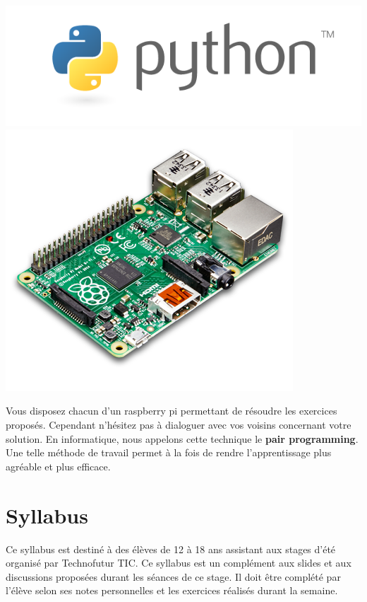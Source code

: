 \documentclass[12pt,a4paper,oneside]{report}
\begin{document}
\begin{minipage}[r]{0.30\textwidth}
	\includegraphics[width=\textwidth]{Ressources/python.png}
	\bigskip
	\includegraphics[width=\textwidth]{Ressources/pi.png}
\end{minipage}

\bigskip
Vous disposez chacun d'un raspberry pi permettant de résoudre les exercices proposés. Cependant n'hésitez pas à dialoguer avec vos voisins concernant votre solution. En informatique, nous appelons cette
technique le \textbf{pair programming}. Une telle méthode de travail
permet à la fois de rendre l'apprentissage plus agréable et plus
efficace.

\section*{Syllabus}
Ce syllabus 
est destiné à des élèves de 12 à 18 ans assistant aux stages d'été organisé par Technofutur TIC. Ce syllabus est un complément aux slides et aux discussions proposées durant les séances de ce stage. Il doit être complété par l'élève selon ses notes personnelles et les exercices réalisés durant la semaine.
\end{document}
